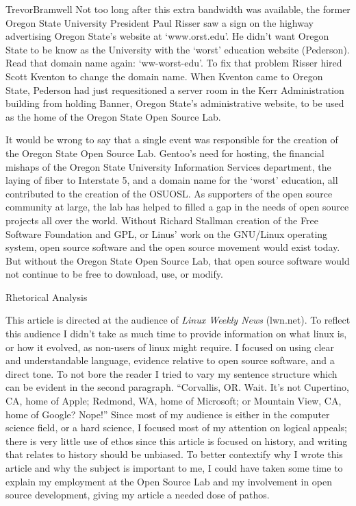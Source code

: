 \documentclass[12pt,letterpaper]{article}
\begin{document}
\begin{mla}{Trevor}{Bramwell}
Not too long after this extra bandwidth was available, the former Oregon State
University President Paul Risser saw a sign on the highway advertising Oregon
State's website at `www.orst.edu'. He didn't want Oregon State to be know as
the University with the `worst' education website (Pederson).
Read that domain name again: `ww-worst-edu'. To fix that problem Risser hired
Scott Kventon to change the domain name. When Kventon came to Oregon State,
Pederson had just requesitioned a server room in the Kerr Administration
building from holding Banner, Oregon State's administrative website, to be used
as the home of the Oregon State Open Source Lab.

It would be wrong to say that a single event was responsible for the creation
of the Oregon State Open Source Lab. Gentoo's need for hosting, the financial
mishaps of the Oregon State University Information Services department, the
laying of fiber to Interstate 5, and a domain name for the `worst' education,
all contributed to the creation of the OSUOSL. As supporters of the open source
community at large, the lab has helped to filled a gap in the needs of open
source projects all over the world. 
Without Richard Stallman creation of the Free Software Foundation and GPL,
or Linus' work on the GNU/Linux operating system, open source software
and the open source movement would exist today.  
But without the Oregon State Open Source Lab, that open source software 
would not continue to be free to download, use, or modify.

%
\pagebreak
{\centering Rhetorical Analysis\\}

This article is directed at the audience of \emph{Linux Weekly News} (lwn.net).
To reflect this audience I didn't take as much time to provide information on 
what linux is, or how it evolved, as non-users of linux might require. I
focused on using clear and understandable language, evidence relative to open
source software, and a direct tone. To not bore the reader I tried to vary my
sentence structure which can be evident in the second paragraph. ``Corvallis, 
OR.  Wait. It's not Cupertino, CA, home of Apple; Redmond, WA, home of 
Microsoft; or Mountain View, CA, home of Google? Nope!'' Since most of my 
audience is either in the
computer science field, or a hard science, I focused most of my attention on
logical appeals; there is very little use of ethos since this article
is focused on history, and writing that relates to history should be unbiased.
To better contextify why I wrote this article and why the subject is important
to me, I could have taken some time to explain my employment at the Open Source
Lab and my involvement in open source development, giving my article a needed
dose of pathos.


\end{mla}
\end{document}

